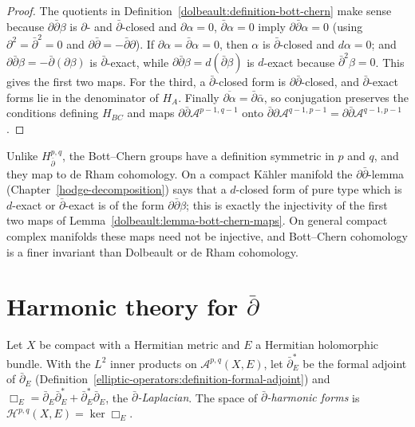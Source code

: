\begin{proof}
The quotients in Definition~\ref{dolbeault:definition-bott-chern} make sense because $\partial\bar\partial\beta$ is $\partial$- and $\bar\partial$-closed and $\partial\alpha = 0$, $\bar\partial\alpha = 0$ imply
$\partial\bar\partial\alpha = 0$ (using $\partial^2 = \bar\partial^2 = 0$ and $\partial\bar\partial = -\bar\partial\partial$). If $\partial\alpha = \bar\partial\alpha = 0$, then $\alpha$ is $\bar\partial$-closed and
$d\alpha = 0$; and $\partial\bar\partial\beta = -\bar\partial(\partial\beta)$ is $\bar\partial$-exact, while $\partial\bar\partial\beta = d(\bar\partial\beta)$ is $d$-exact because $\bar\partial^2\beta = 0$. This gives the first
two maps. For the third, a $\bar\partial$-closed form is $\partial\bar\partial$-closed, and $\bar\partial$-exact forms lie in the denominator of $H_A$. Finally $\overline{\partial\alpha} = \bar\partial\bar\alpha$, so conjugation
preserves the conditions defining $H_{BC}$ and maps $\partial\bar\partial\mathcal{A}^{p-1,q-1}$ onto $\bar\partial\partial\mathcal{A}^{q-1,p-1} = \partial\bar\partial\mathcal{A}^{q-1,p-1}$.
\end{proof}

\begin{remark}\label{dolbeault:remark-bott-chern}
Unlike $H^{p,q}_{\bar\partial}$, the Bott--Chern groups have a definition symmetric in $p$ and $q$, and they map to de Rham cohomology. On a compact K\"ahler manifold the $\partial\bar\partial$-lemma
(Chapter~\ref{hodge-decomposition}) says that a $d$-closed form of pure type which is $d$-exact or $\bar\partial$-exact is of the form $\partial\bar\partial\beta$; this is exactly the injectivity of the first two
maps of Lemma~\ref{dolbeault:lemma-bott-chern-maps}. On general compact complex manifolds these maps need not be injective, and Bott--Chern cohomology is a finer invariant than Dolbeault or de Rham
cohomology.
\end{remark}

\section{Harmonic theory for $\bar\partial$}\label{dolbeault:section-harmonic}

\begin{definition}\label{dolbeault:definition-dbar-laplacian}
Let $X$ be compact with a Hermitian metric and $E$ a Hermitian holomorphic bundle. With the $L^2$ inner products on $\mathcal{A}^{p,q}(X, E)$, let $\bar\partial_E^*$ be the formal adjoint of $\bar\partial_E$
(Definition~\ref{elliptic-operators:definition-formal-adjoint}) and $\Box_E = \bar\partial_E\bar\partial_E^* + \bar\partial_E^*\bar\partial_E$, the \emph{$\bar\partial$-Laplacian}. The space of
\emph{$\bar\partial$-harmonic forms} is $\mathcal{H}^{p,q}(X, E) = \ker\Box_E$.
\end{definition}

